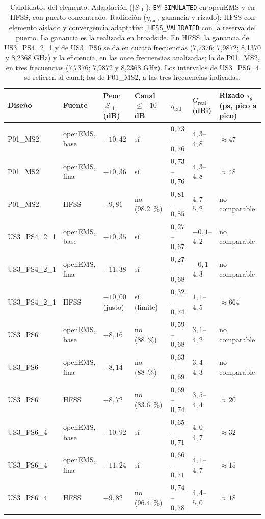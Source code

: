 \documentclass[11pt,a4paper]{article}
\begin{document}
\begin{table}[H]
    \centering
    \caption{Candidatos del elemento. Adaptación ($|S_{11}|$): \texttt{EM\_SIMULATED} en openEMS y en HFSS, con puerto concentrado. Radiación ($\eta_\mathrm{rad}$, ganancia y rizado): HFSS con elemento aislado y convergencia adaptativa, \texttt{HFSS\_VALIDATED} con la reserva del puerto. La ganancia es la realizada en broadside. En HFSS, la ganancia de US3\_PS4\_2\_1 y de US3\_PS6 se da en cuatro frecuencias (7,7376; 7,9872; 8,1370 y 8,2368 GHz) y la eficiencia, en las once frecuencias analizadas; la de P01\_MS2, en tres frecuencias (7,7376; 7,9872 y 8,2368 GHz). Los intervalos de US3\_PS6\_4 se refieren al canal; los de P01\_MS2, a las tres frecuencias indicadas.}
    \label{tab:candidatos}
    {\small
    \begin{tabularx}{\textwidth}{l l *{5}{>{\centering\arraybackslash}X}}
        \toprule
        Diseño & Fuente & Peor $|S_{11}|$ (\si{dB}) & Canal $\le -10$\,\si{dB} & $\eta_\mathrm{rad}$ & $G_\mathrm{real}$ (\si{dBi}) & Rizado $\tau_g$ (\si{ps}, pico a pico) \\
        \midrule
        P01\_MS2 & openEMS, base & $-10{,}42$ & sí & $0{,}73$--$0{,}76$ & $4{,}3$--$4{,}8$ & $\approx 47$ \\
        P01\_MS2 & openEMS, fina & $-10{,}36$ & sí & $0{,}73$--$0{,}76$ & $4{,}3$--$4{,}8$ & $\approx 48$ \\
        P01\_MS2 & HFSS & $-9{,}81$ & no (\SI{98.2}{\percent}) & $0{,}81$--$0{,}85$ & $4{,}7$--$5{,}2$ & no comparable \\
        \midrule
        US3\_PS4\_2\_1 & openEMS, base & $-10{,}35$ & sí & $0{,}27$--$0{,}67$ & $-0{,}1$--$4{,}2$ & no comparable \\
        US3\_PS4\_2\_1 & openEMS, fina & $-11{,}38$ & sí & $0{,}27$--$0{,}68$ & $-0{,}1$--$4{,}3$ & no comparable \\
        US3\_PS4\_2\_1 & HFSS & $-10{,}00$ (justo) & sí (límite) & $0{,}32$--$0{,}74$ & $1{,}1$--$4{,}5$ & $\approx 664$ \\
        \midrule
        US3\_PS6 & openEMS, base & $-8{,}16$ & no (\SI{88}{\percent}) & $0{,}59$--$0{,}68$ & $3{,}1$--$4{,}2$ & no comparable \\
        US3\_PS6 & openEMS, fina & $-8{,}14$ & no (\SI{88}{\percent}) & $0{,}63$--$0{,}69$ & $3{,}4$--$4{,}3$ & no comparable \\
        US3\_PS6 & HFSS & $-8{,}72$ & no (\SI{83.6}{\percent}) & $0{,}69$--$0{,}74$ & $3{,}5$--$4{,}4$ & $\approx 20$ \\
        \midrule
        US3\_PS6\_4 & openEMS, base & $-10{,}92$ & sí & $0{,}65$--$0{,}71$ & $4{,}0$--$4{,}7$ & $\approx 32$ \\
        US3\_PS6\_4 & openEMS, fina & $-11{,}24$ & sí & $0{,}66$--$0{,}71$ & $4{,}1$--$4{,}7$ & $\approx 15$ \\
        US3\_PS6\_4 & HFSS & $-9{,}82$ & no (\SI{96.4}{\percent}) & $0{,}74$--$0{,}78$ & $4{,}4$--$5{,}0$ & $\approx 18$ \\
        \bottomrule
    \end{tabularx}
    }
\end{table}
\end{document}
